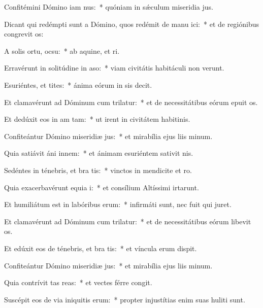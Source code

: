 \item Confitémini Dómino iam nus:~* quóniam in sǽculum miseridia jus.
\item Dicant qui redémpti sunt a Dómino, quos redémit de manu ici:~* et de regiónibus congrevit os:
\item A solis ortu,  ocsu:~* ab aquine, et ri.
\item Erravérunt in solitúdine in aso:~* viam civitátis habitáculi non verunt.
\item Esuriéntes, et tites:~* ánima eórum in sis decit.
\item Et clamavérunt ad Dóminum cum trilatur:~* et de necessitátibus eórum epuit os.
\item Et dedúxit eos in am tam:~* ut irent in civitátem habitinis.
\item Confiteántur Dómino miseridiæ jus:~* et mirabília ejus liis minum.
\item Quia satiávit áni innem:~* et ánimam esuriéntem sativit nis.
\item Sedéntes in ténebris, et bra tis:~* vinctos in mendicite et ro.
\item Quia exacerbavérunt equia i:~* et consílium Altíssimi irtarunt.
\item Et humiliátum est in labóribus  erum:~* infirmáti sunt, nec fuit qui juret.
\item Et clamavérunt ad Dóminum cum trilatur:~* et de necessitátibus eórum libevit os.
\item Et edúxit eos de ténebris, et bra tis:~* et víncula erum dispit.
\item Confiteántur Dómino miseridiæ jus:~* et mirabília ejus liis minum.
\item Quia contrívit tas reas:~* et vectes férre congit.
\item Suscépit eos de via iniquitis erum:~* propter injustítias enim suas huliti sunt.

